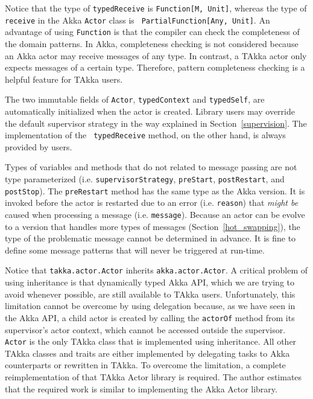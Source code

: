 Notice that the type of {\tt typedReceive} is {\tt Function[M, Unit]}, whereas 
the type of {\tt receive} in the Akka {\tt Actor} class is {\tt 
PartialFunction[Any, Unit]}.  An 
advantage of using {\tt Function} is that the compiler can check the 
completeness of the domain patterns.  In Akka, completeness checking is not considered
because an Akka actor may receive messages of any type.  In contrast, a TAkka 
actor only expects messages of a certain type.  Therefore, pattern completeness 
checking is a helpful feature for TAkka users.

The two immutable fields of {\tt Actor}, {\tt typedContext} and 
{\tt typedSelf}, are automatically initialized when the actor is created.
Library users may override the default supervisor strategy in the
way explained in Section~\ref{supervision}.  The implementation of the {\tt
typedReceive} method, on the other hand, is always provided by users.

Types of variables and methods that do not related to message passing are not
type parameterized (i.e. {\tt supervisorStrategy}, {\tt preStart}, {\tt postRestart}, and {\tt postStop}).
The {\tt preRestart} method has the same type as the Akka version.  It is invoked before the
actor is restarted due to an error (i.e. {\tt reason}) that {\it might be} caused when processing a message (i.e. {\tt message}).
Because an actor can be evolve to a version that handles more types of messages (Section~\ref{hot_swapping}),
the type of the problematic message cannot be determined in advance.  It is fine to
define some message patterns that will never be triggered at run-time.


Notice that {\tt takka.actor.Actor} inherits {\tt akka.actor.Actor}.  A 
critical problem of using inheritance is that dynamically typed 
Akka API, which we are trying to avoid whenever possible, are still available 
to TAkka users.  Unfortunately, this limitation cannot be overcome by using 
delegation because, as we have seen in the Akka API, a child actor is created by 
calling the {\tt actorOf} method from its supervisor's actor context, which 
cannot be accessed outside the supervisor. {\tt Actor} is the only TAkka 
class that is implemented using inheritance. All other TAkka classes and traits 
are either implemented by delegating tasks to Akka counterparts or rewritten in 
TAkka.  To overcome the limitation, a complete reimplementation of that TAkka
Actor library is required.  The author estimates that the required work is
similar to implementing the Akka Actor library.


